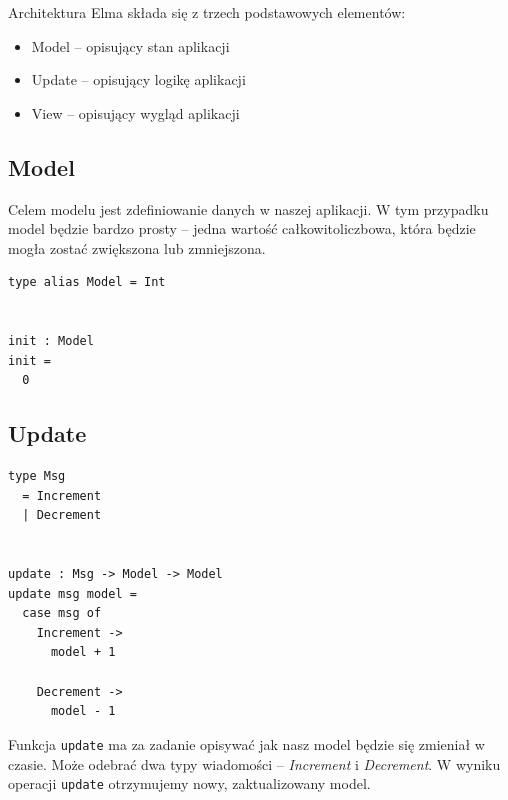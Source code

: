 \documentclass[twoside,a4paper]{report}
\begin{document}
Architektura Elma składa się z trzech podstawowych elementów:
\begin{itemize}
    \setlength\itemsep{-0.1em}
    \item Model -- opisujący stan aplikacji
    \item Update -- opisujący logikę aplikacji
    \item View -- opisujący wygląd aplikacji
\end{itemize}

\subsection{Model}
\begin{minipage}{.50\textwidth}
    Celem modelu jest zdefiniowanie danych w naszej aplikacji.
    W tym przypadku model będzie bardzo prosty -- jedna wartość całkowitoliczbowa, która będzie mogła zostać zwiększona lub zmniejszona.
\end{minipage}\hfill
\begin{minipage}{.45\textwidth}
    \lstset{frame=single}
    \begin{lstlisting}[caption={\textit{The Elm Architecture} - Model},label=kod:Model]
type alias Model = Int


init : Model
init =
  0
    \end{lstlisting}
\end{minipage}\hfill

\subsection{Update}
\begin{minipage}{.45\textwidth}
    \lstset{frame=single}
    \begin{lstlisting}[caption={\textit{The Elm Architecture} - Update},label=kod:Update]
type Msg
  = Increment
  | Decrement


update : Msg -> Model -> Model
update msg model =
  case msg of
    Increment ->
      model + 1

    Decrement ->
      model - 1
    \end{lstlisting}
\end{minipage}\hfill
\begin{minipage}{.50\textwidth}
    Funkcja \verb|update| ma za zadanie opisywać jak nasz model będzie się zmieniał w czasie.
    Może odebrać dwa typy wiadomości -- \textit{Increment} i \textit{Decrement}.
    W wyniku operacji \verb|update| otrzymujemy nowy, zaktualizowany model.
\end{minipage}\hfill
\end{document}
